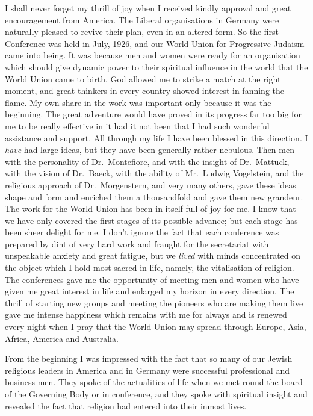 I shall never forget my thrill of joy when I received
kindly approval and great encouragement from America.
The Liberal organisations in Germany were naturally
pleased to revive their plan, even in an altered form. So
the first Conference was held in July, 1926, and our World
Union for Progressive Judaism came into being. It was
because men and women were ready for an organisation
which should give dynamic power to their spiritual influence
in the world that the World Union came to birth.
God allowed me to strike a match at the right moment,
and great thinkers in every country showed interest in
fanning the flame. My own share in the work was
important only because it was the beginning. The great
adventure would have proved in its progress far too big
for me to be really effective in it had it not been that I
had such wonderful assistance and support. All through
my life I have been blessed in this direction. I \textsl{have} had
large ideas, but they have been generally rather nebulous.
Then men with the personality of Dr.\ Montefiore, and
with the insight of Dr.\ Mattuck, with the vision of
Dr.\ Baeck, with the ability of Mr.\ Ludwig Vogelstein,
and the religious approach of Dr.\ Morgenstern, and very
many others, gave these ideas shape and form and
enriched them a thousandfold and gave them new
grandeur. The work for the World Union has been in
itself full of joy for me. I know that we have only
covered the first stages of its possible advance; but each
stage has been sheer delight for me. I don’t ignore the
fact that each conference was prepared by dint of very
hard work and fraught for the secretariat with unspeakable
anxiety and great fatigue, but we \textsl{lived} with minds
concentrated on the object which I hold most sacred in
life, namely, the vitalisation of religion. The conferences
gave me the opportunity of meeting men and women
who have given me great interest in life and enlarged my
horizon in every direction. The thrill of starting new
groups and meeting the pioneers who are making them
live gave me intense happiness which remains with me
for always and is renewed every night when I pray that
the World Union may spread through Europe, Asia,
Africa, America and Australia.

From the beginning I was impressed with the fact
that so many of our Jewish religious leaders in America
and in Germany were successful professional and business
men. They spoke of the actualities of life when we met
round the board of the Governing Body or in conference,
and they spoke with spiritual insight and revealed the
fact that religion had entered into their inmost lives.

